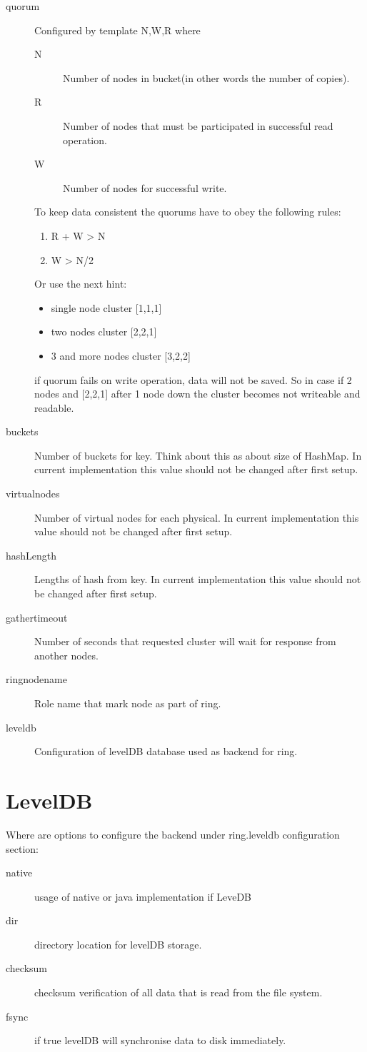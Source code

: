 \begin{description}
\item[quorum] Configured by template N,W,R where

\begin{description}
\item[N] Number of nodes in bucket(in other words the number of copies).
\item[R] Number of nodes that must  be participated in successful read operation.
\item[W] Number of nodes for successful write.
\end{description}

To keep data consistent the quorums have to obey the following rules:
\begin{enumerate}
\item R + W > N
\item W > N/2
\end{enumerate}

Or use the next hint:
\begin{itemize}
\item single node cluster [1,1,1]
\item two nodes cluster [2,2,1]
\item 3 and more nodes cluster [3,2,2]
\end{itemize}

if quorum fails on write operation, data will not be saved.
So in case if 2 nodes and [2,2,1] after 1 node down the cluster becomes not writeable and readable.
\item[buckets] Number of buckets for key. Think about this as about size of HashMap. In current implementation this value should not 
 be changed after first setup.
\item[virtual\-nodes] Number of virtual nodes for each physical. In current implementation this value should not
 be changed after first setup.
\item[hashLength] Lengths of hash from key. In current implementation this value should not
 be changed after first setup.
\item[gather\-timeout] Number of seconds that requested cluster will wait for response from another nodes.
\item[ring\-node\-name] Role name that mark node as part of ring.
\item[leveldb] Configuration of levelDB database used as backend for ring.
\end{description}


\section{LevelDB}
Where are options to configure the backend under ring.leveldb configuration section:
\begin{description}
\item[native] usage of native or java implementation if LeveDB
\item[dir] directory location for levelDB storage.
\item[checksum] checksum verification of all data that is read from the file system.
\item[fsync] if true levelDB will synchronise data to disk immediately.
\end{description}